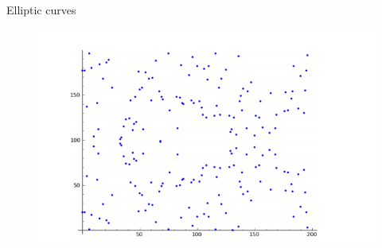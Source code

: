 \documentclass{beamer}
\begin{document}
\begin{frame}{Elliptic curves}
\begin{figure}
\begin{minipage}{0.48\textwidth}
		\label{fig:elliptic_curve_c}
	\end{minipage}\hfill
	\begin{minipage}{0.48\textwidth}
		\centering
		\includegraphics[width=.7\linewidth]{elliptic_curve_fp}
		\label{fig:elliptic_curve_fp]}
	\end{minipage}
\end{figure}


\end{frame}
\end{document}
